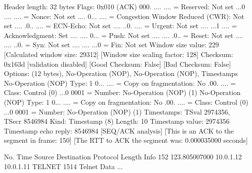     Header length: 32 bytes
    Flags: 0x010 (ACK)
        000. .... .... = Reserved: Not set
        ...0 .... .... = Nonce: Not set
        .... 0... .... = Congestion Window Reduced (CWR): Not set
        .... .0.. .... = ECN-Echo: Not set
        .... ..0. .... = Urgent: Not set
        .... ...1 .... = Acknowledgment: Set
        .... .... 0... = Push: Not set
        .... .... .0.. = Reset: Not set
        .... .... ..0. = Syn: Not set
        .... .... ...0 = Fin: Not set
    Window size value: 229
    [Calculated window size: 29312]
    [Window size scaling factor: 128]
    Checksum: 0x163d [validation disabled]
        [Good Checksum: False]
        [Bad Checksum: False]
    Options: (12 bytes), No-Operation (NOP), No-Operation (NOP), Timestamps
        No-Operation (NOP)
            Type: 1
                0... .... = Copy on fragmentation: No
                .00. .... = Class: Control (0)
                ...0 0001 = Number: No-Operation (NOP) (1)
        No-Operation (NOP)
            Type: 1
                0... .... = Copy on fragmentation: No
                .00. .... = Class: Control (0)
                ...0 0001 = Number: No-Operation (NOP) (1)
        Timestamps: TSval 2974356, TSecr 8546984
            Kind: Timestamp (8)
            Length: 10
            Timestamp value: 2974356
            Timestamp echo reply: 8546984
    [SEQ/ACK analysis]
        [This is an ACK to the segment in frame: 150]
        [The RTT to ACK the segment was: 0.000035000 seconds]

No.     Time           Source                Destination           Protocol Length Info
    152 123.805007000  10.0.1.12             10.0.1.11             TELNET   1514   Telnet Data ...

